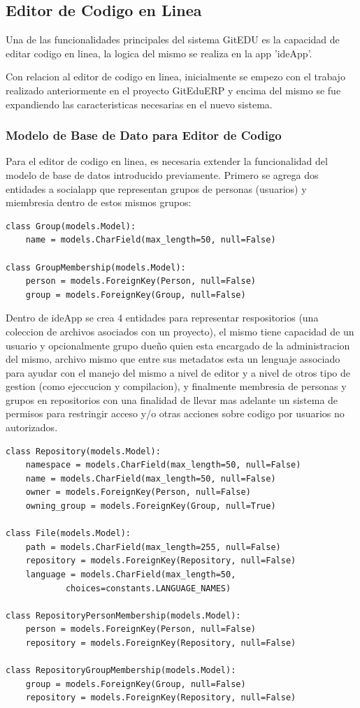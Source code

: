 \subsection{Editor de Codigo en Linea}
Una de las funcionalidades principales del sistema GitEDU es la capacidad de editar codigo en linea, la logica del mismo se realiza en la app 'ideApp'.

Con relacion al editor de codigo en linea, inicialmente se empezo con el trabajo realizado anteriormente en el proyecto GitEduERP y encima del mismo se fue expandiendo las caracteristicas necesarias en el nuevo sistema.

\subsubsection{Modelo de Base de Dato para Editor de Codigo}
Para el editor de codigo en linea, es necesaria extender la funcionalidad del modelo de base de datos introducido previamente. Primero se agrega dos entidades a socialapp que representan grupos de personas (usuarios) y miembresia dentro de estos mismos grupos:
\lstset{language=Python}
\begin{lstlisting}
class Group(models.Model):
    name = models.CharField(max_length=50, null=False)

class GroupMembership(models.Model):
    person = models.ForeignKey(Person, null=False)
    group = models.ForeignKey(Group, null=False)
\end{lstlisting}
\lstset{language=Bash}

Dentro de ideApp se crea 4 entidades para representar respositorios (una coleccion de archivos asociados con un proyecto), el mismo tiene capacidad de un usuario y opcionalmente grupo dueño quien esta encargado de la administracion del mismo, archivo mismo que entre sus metadatos esta un lenguaje associado para ayudar con el manejo del mismo a nivel de editor y a nivel de otros tipo de gestion (como ejeccucion y compilacion), y finalmente membresia de personas y grupos en repositorios con una finalidad de llevar mas adelante un sistema de permisos para restringir acceso y/o otras acciones sobre codigo por usuarios no autorizados.
\lstset{language=Python}
\begin{lstlisting}
class Repository(models.Model):
    namespace = models.CharField(max_length=50, null=False)
    name = models.CharField(max_length=50, null=False)
    owner = models.ForeignKey(Person, null=False)
    owning_group = models.ForeignKey(Group, null=True)

class File(models.Model):
    path = models.CharField(max_length=255, null=False)
    repository = models.ForeignKey(Repository, null=False)
    language = models.CharField(max_length=50,
            choices=constants.LANGUAGE_NAMES)

class RepositoryPersonMembership(models.Model):
    person = models.ForeignKey(Person, null=False)
    repository = models.ForeignKey(Repository, null=False)

class RepositoryGroupMembership(models.Model):
    group = models.ForeignKey(Group, null=False)
    repository = models.ForeignKey(Repository, null=False)
\end{lstlisting}
\lstset{language=Bash}

